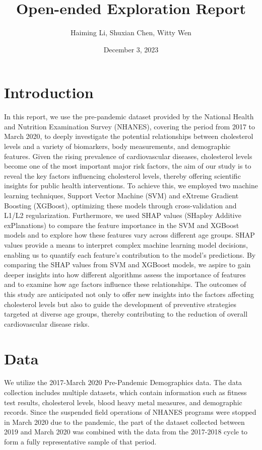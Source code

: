 \documentclass{article}
\title{\textbf{Open-ended Exploration Report}}
\author{Haiming Li, Shuxian Chen, Witty Wen}
\date{December 3, 2023}
\begin{document}
\maketitle

\section{Introduction}

In this report, we use the pre-pandemic dataset provided by the National Health and Nutrition Examination Survey (NHANES), covering the period from 2017 to March 2020, to deeply investigate the potential relationships between cholesterol levels and a variety of biomarkers, body measurements, and demographic features. Given the rising prevalence of cardiovascular diseases, cholesterol levels become one of the most important major risk factors, the aim of our study is to reveal the key factors influencing cholesterol levels, thereby offering scientific insights for public health interventions. To achieve this, we employed two machine learning techniques, Support Vector Machine (SVM) and eXtreme Gradient Boosting (XGBoost), optimizing these models through cross-validation and L1/L2 regularization. Furthermore, we used SHAP values (SHapley Additive exPlanations) to compare the feature importance in the SVM and XGBoost models and to explore how these features vary across different age groups. SHAP values provide a means to interpret complex machine learning model decisions, enabling us to quantify each feature's contribution to the model's predictions. By comparing the SHAP values from SVM and XGBoost models, we aspire to gain deeper insights into how different algorithms assess the importance of features and to examine how age factors influence these relationships. The outcomes of this study are anticipated not only to offer new insights into the factors affecting cholesterol levels but also to guide the development of preventive strategies targeted at diverse age groups, thereby contributing to the reduction of overall cardiovascular disease risks. 

\section{Data}

We utilize the 2017-March 2020 Pre-Pandemic Demographics data. The data collection includes multiple datasets, which contain information such as fitness test results, cholesterol levels, blood heavy metal measures, and demographic records. Since the suspended field operations of NHANES programs were stopped in March 2020 due to the pandemic, the part of the dataset collected between 2019 and March 2020 was combined with the data from the 2017-2018 cycle to form a fully representative sample of that period. 
\end{document}
